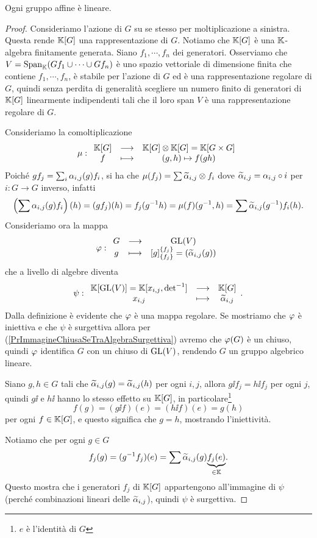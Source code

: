 \begin{theorem}
Ogni gruppo affine \`e lineare.
\end{theorem}
\begin{proof}
Consideriamo l'azione di $G$ su se stesso per moltiplicazione a sinistra. Questa rende $\mathbb{K}[G]$ una rappresentazione di $G$. Notiamo che $\mathbb{K}[G]$ \`e una $\mathbb{K}$-algebra finitamente generata. Siano $f_1,\cdots, f_n$ dei generatori. Osserviamo che $V=\operatorname{Span}_{\mathbb{K}}(G f_1\cup\cdots\cup G f_n)$ \`e uno spazio vettoriale di dimensione finita che contiene $f_1,\cdots, f_n$, \`e stabile per l'azione di $G$ ed \`e una rappresentazione regolare di $G$, quindi senza perdita di generalit\`a scegliere un numero finito di generatori di $\mathbb{K}[G]$ linearmente indipendenti tali che il loro span $V$ \`e una rappresentazione regolare di $G$.

Consideriamo la comoltiplicazione
\[\mu:\begin{array}{ccc} {\mathbb{K}[G]} & \longrightarrow & {\mathbb{K}[G]\otimes\mathbb{K}[G]=\mathbb{K}[G\times G]}\\ {f} & \longmapsto & {(g,h)\mapsto f(gh)} \end{array}\]
Poich\'e $gf_j=\sum_{i}\alpha_{i,j}(g)f_i$, si ha che $\mu(f_j)=\sum \widetilde{\alpha}_{i,j}\otimes f_i$ dove $\widetilde{\alpha}_{i,j}=\alpha_{i,j}\circ i$ per $i:G\to G$ inverso, infatti
\[\left({\sum \alpha_{i,j}(g) f_i}\right)(h)=(g f_j)(h)=f_j(g^{-1} h)=\mu(f)(g^{-1},h)=\sum \widetilde{\alpha}_{i,j}(g^{-1})f_i(h).\]
Consideriamo ora la mappa
\[\varphi:\begin{array}{ccc} {G} & \longrightarrow & {\operatorname{GL}(V)}\\ {g} & \longmapsto & {[g]^{\left\{{f_j}\right\}}_{\left\{{f_j}\right\}}=(\widetilde{\alpha}_{i,j}(g))} \end{array}\]
che a livello di algebre diventa
\[\psi:\begin{array}{ccc} {\mathbb{K}[\operatorname{GL}(V)]=\mathbb{K}[x_{i,j},\det^{-1}]} & \longrightarrow & {\mathbb{K}[G]}\\ {x_{i,j}} & \longmapsto & {\widetilde{\alpha}_{i,j}} \end{array}.\]
Dalla definizione \`e evidente che $\varphi$ \`e una mappa regolare. Se mostriamo che $\varphi$ \`e iniettiva e che $\psi$ \`e surgettiva allora per (\ref{PrImmagineChiusaSeTraAlgebraSurgettiva}) avremo che $\varphi(G)$ \`e un chiuso, quindi $\varphi$ identifica $G$ con un chiuso di $\operatorname{GL}(V)$, rendendo $G$ un gruppo algebrico lineare.

Siano $g, h\in G$ tali che $\widetilde{\alpha}_{i,j}(g)=\widetilde{\alpha}_{i,j}(h)$ per ogni $i,j$, allora $g\ii f_j=h\ii f_j$ per ogni $j$, quindi $g\ii$ e $h\ii$ hanno lo stesso effetto su $\mathbb{K}[G]$, in particolare\footnote{$e$ \`e l'identit\`a di $G$}
\[f(g)=(g\ii f)(e)=(h\ii f)(e)=g(h)\]
per ogni $f\in\mathbb{K}[G]$, e questo significa che $g=h$, mostrando l'iniettivit\`a.

Notiamo che per ogni $g\in G$
\[f_j(g)=(g^{-1} f_j)(e)=\sum \widetilde{\alpha}_{i,j}(g)\underset{\in\mathbb{K}}{\underbrace{f_j(e)}}.\]
Questo mostra che i generatori $f_j$ di $\mathbb{K}[G]$ appartengono all'immagine di $\psi$ (perch\'e combinazioni lineari delle $\widetilde{\alpha}_{i,j}$), quindi $\psi$ \`e surgettiva.
\end{proof}


